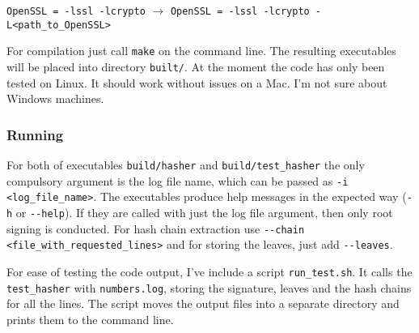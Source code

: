 \documentclass[11pt]{article}
\newcommand{\ct}[1]{\texttt{#1}}
\begin{document}
\begin{center}\ct{OpenSSL = -lssl -lcrypto} \hspace{2pt} $\rightarrow$ \hspace{2pt} \ct{OpenSSL = -lssl -lcrypto -L<path\_to\_OpenSSL>}\end{center}

For compilation just call \ct{make} on the command line. The resulting executables will be placed into directory \ct{built/}. At the moment the code has only been tested on Linux. It should work without issues on a Mac. I'm not sure about Windows machines. 


\subsubsection{Running} %
\label{ssub:running}

For both of executables \ct{build/hasher} and \ct{build/test\_hasher} the only compulsory argument is the log file name, which can be passed as \ct{-i <log\_file\_name>}. The executables produce help messages in the expected way (\ct{-h} or \ct{-{}-help}). If they are called with just the log file argument, then only root signing is conducted. For hash chain extraction use \ct{-{}-chain <file\_with\_requested\_lines>} and for storing the leaves, just add \ct{-{}-leaves}.  

For ease of testing the code output, I've include a script \ct{run\_test.sh}. It calls the \ct{test\_hasher} with \ct{numbers.log}, storing the signature, leaves and the hash chains for all the lines. The script moves the output files into a separate directory and prints them to the command line.  





\end{document}
